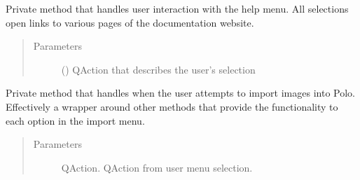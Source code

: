 \documentclass[letterpaper,10pt,english]{sphinxmanual}
\begin{document}
\begin{fulllineitems}
\begin{fulllineitems}
\begin{quote}
\begin{description}
\end{description}\end{quote}

\end{fulllineitems}


\begin{fulllineitems}
\label{\detokenize{polo.windows:polo.windows.main_window.MainWindow._handle_help_menu}}
Private method that handles user interaction with the help menu. 
All selections open links to various pages of the documentation website.
\begin{quote}\begin{description}
\item[{Parameters}] \leavevmode
{} () \textendash{} QAction that describes the user’s selection

\end{description}\end{quote}

\end{fulllineitems}


\begin{fulllineitems}
\label{\detokenize{polo.windows:polo.windows.main_window.MainWindow._handle_image_import}}
Private method that handles when the user attempts to import images into Polo. 
Effectively a wrapper around other methods that provide the functionality to
each option in the import menu.
\begin{quote}\begin{description}
\item[{Parameters}] \leavevmode
{} \textendash{} QAction. QAction from user menu selection.

\end{description}\end{quote}


\end{fulllineitems}
\end{fulllineitems}
\end{document}
